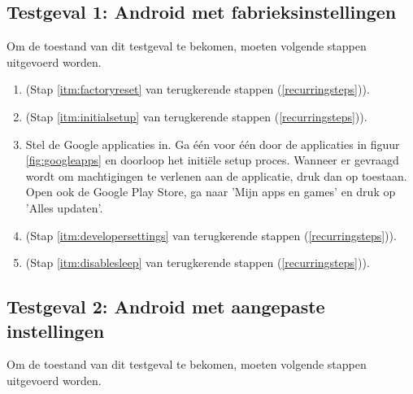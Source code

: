 \subsection{Testgeval 1: Android met fabrieksinstellingen}

Om de toestand van dit testgeval te bekomen, moeten volgende stappen uitgevoerd worden.
\begin{enumerate}
    \item 
     (Stap \ref{itm:factoryreset} van terugkerende stappen (\ref{recurringsteps})).
    
    \item 
     (Stap \ref{itm:initialsetup} van terugkerende stappen (\ref{recurringsteps})).
    
    \item 
    Stel de Google applicaties in. Ga één voor één door de applicaties in figuur \ref{fig:googleapps} en doorloop  het initiële setup proces. Wanneer er gevraagd wordt om machtigingen te verlenen aan de applicatie, druk dan op toestaan. Open ook de Google Play Store, ga naar 'Mijn apps en games' en druk op 'Alles updaten'.
    
    \item 
     (Stap \ref{itm:developersettings} van terugkerende stappen (\ref{recurringsteps})).
    
    \item 
     (Stap \ref{itm:disablesleep} van terugkerende stappen (\ref{recurringsteps})).
\end{enumerate}


\subsection{Testgeval 2: Android met aangepaste instellingen}

Om de toestand van dit testgeval te bekomen, moeten volgende stappen uitgevoerd worden.

